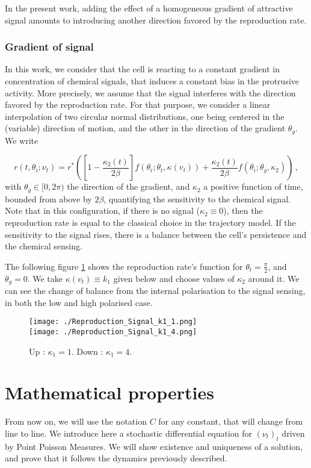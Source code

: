 \documentclass[a4paper,11pt]{article}
\begin{document}
In the present work, adding the effect of a homogeneous gradient of attractive signal amounts to introducing another direction favored by the reproduction rate. 

\subsubsection{Gradient of signal}
In this work, we consider that the cell is reacting to a constant gradient in concentration of chemical signals, that induces a constant bias in the protrusive activity. More precisely, we assume that the signal interferes with the direction favored by the reproduction rate. For that purpose, we consider a linear interpolation of two circular normal distributions, one being centered in the (variable) direction of motion, and the other in the direction of the gradient $\theta_g$. We write

\begin{equation}
r(t,\theta_i;\nu_t) = r^* \left( \left[1-\frac{\kappa_2(t)}{2\beta}\right] f(\theta_i; \theta_t,\kappa(v_t)) + \frac{\kappa_2(t)}{2\beta} f(\theta_i; \theta_g,\kappa_2) \right) \,,
\end{equation} 
with $\theta_g \in [0,2\pi)$ the direction of the gradient, and $\kappa_2$ a positive function of time, bounded from above by $2\beta$, quantifying the sensitivity to the chemical signal. Note that in this configuration, if there is no signal ($\kappa_2 \equiv 0$), then the reproduction rate is equal to the classical choice in the trajectory model. If the sensitivity to the signal rises, there is a balance between the cell's persistence and the chemical sensing. \par


The following figure \ref{fig:ReproductionRate} shows the reproduction rate's function for $\theta_t=\frac{\pi}{2}$, and $\theta_g=0$. We take $\kappa(v_t) \equiv k_1$ given below and choose values of $\kappa_2$ around it. We can see the change of balance from the internal polarisation to the signal sensing, in both the low and high polarised case. 

\begin{figure}[H]
\centering
\texttt{[image: ./Reproduction\_Signal\_k1\_1.png]}\\
\texttt{[image: ./Reproduction\_Signal\_k1\_4.png]}
\caption{Up : $\kappa_1 = 1$. Down : $\kappa_1 = 4$. }\label{fig:ReproductionRate}
\end{figure}


\section{Mathematical properties}
From now on, we will use the notation $C$ for any constant, that will change from line to line. We introduce here a stochastic differential equation for $(\nu_t)_t$ driven by Point Poisson Measures. We will show existence and uniqueness of a solution, and prove that it follows the dynamics previously described. 
\end{document}
